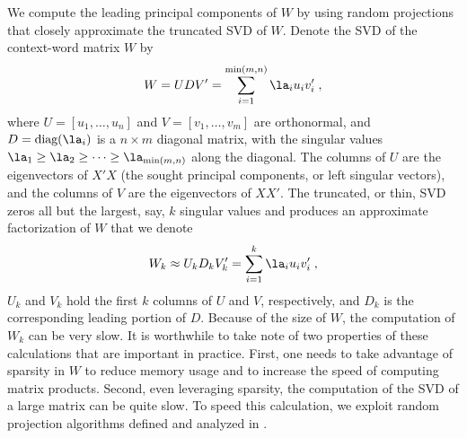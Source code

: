\documentclass[12pt]{article}
\begin{document}
 
 We compute the leading principal components of $W$ by using random projections that
 closely approximate the truncated SVD of $W$.  Denote the SVD of the context-word matrix $W$ by
 \begin{equation}
       W = U D V' = \sum _{i=1}^{\min(m,n)} \la_i u_i v_i' \;,
 \end{equation}
 where $U = [u_1,\ldots,u_n]$ and $V=[v_1,\ldots,v_m]$ are orthonormal, and $D = \mbox{diag}(\la_i)$ is a $n \times m$ diagonal matrix,
 with the singular values $\la_1 \ge \la_2 \ge \cdots \ge \la_{\min(m,n)}$ along the diagonal.  The columns of $U$ are the eigenvectors of $X'X$ (the sought principal components,
 or left singular vectors), and the columns of $V$ are
 the eigenvectors of $XX'$.  The truncated, or thin, SVD zeros all but the
 largest, say, $k$ singular values and produces an approximate
 factorization of $W$ that we denote
 \begin{equation}
       W_k \approx U_k D_k V_k' = \sum _{i=1}^k \la_i u_i v_i' \;,
 \label{eq:Wk}
 \end{equation}
 $U_k$ and $V_k$ hold the first $k$ columns of $U$ and $V$, respectively, and $D_k$ is the corresponding leading portion of $D$.  Because of the size of $W$, the computation
 of $W_k$ can be very slow.  
 It is worthwhile to take note of two properties of these calculations that are
 important in practice.  First, one needs to take advantage of sparsity in  $W$ to reduce memory usage and to increase the speed of
 computing matrix products.  Second, even leveraging sparsity, the computation of the SVD of a large
 matrix can be quite slow. 
  To speed this calculation, we exploit random projection algorithms defined and
 analyzed in \citet{tropp10}.
\end{document}
